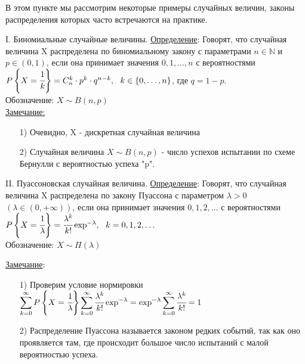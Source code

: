 
В этом пункте мы рассмотрим некоторые примеры случайных величин, законы распределения которых часто встречаются на практике.

I. Биномиальные случайные величины.
\underline{Определение}: Говорят, что случайная величина X распределена по биномиальному закону с параметрами $n \in \mathbb{N}$ и $p \in (0,1)$, если она принимает значения $0,1, \ldots, n$ с вероятностями \\
$P\left\{ X = \cfrac{1}{k} \right\} = C^k_n \cdot p^k \cdot q^{n-k}, \ \ k \in \{0, \ldots, n\}$, где $q = 1 - p$. \\
Обозначение: $X \sim B(n,p)$ \\%

\underline{Замечание:} 
\begin{enumerate}
	\item[1)] 
	Очевидно, X - дискретная случайная величина %
				
	\item[2)] 
	Случайная величина $X \sim B(n,p)$ - число успехов испытании по схеме Бернулли с вероятностью успеха "p".
\end{enumerate}


II. Пуассоновская случайная величина.
\underline{Определение}: Говорят, что случайная величина X распределена по закону Пуассона с параметром $\lambda > 0$ \\
$(\lambda \in (0, +\infty))$, если она принимает значения $0, 1, 2, \ldots$ с вероятностями \\
$P\left\{X = \cfrac{1}{\lambda}\right\} = \cfrac{\lambda^k}{k!} \exp^{-\lambda}, \ \ k = 0, 1, 2, \ldots$ \\
Обозначение: $X \sim \Pi (\lambda)$

\underline{Замечание}:
\begin{enumerate}
\item[1)] Проверим условие нормировки \\
$\displaystyle \sum\limits_{k = 0}^{\infty} P\left\{X = \cfrac{1}{\lambda} \right\} \sum\limits_{k = 0}^{\infty} \cfrac{\lambda^k}{k!} \exp^{-\lambda} = \exp^{-\lambda} \sum\limits_{k = 0}^{\infty} \cfrac{\lambda^k}{k!} = 1$
	
\item[2)] Распределение Пуассона называется законом редких событий, так как оно проявляется там, где происходит большое число испытаний с малой вероятностью успеха.
\end{enumerate}

